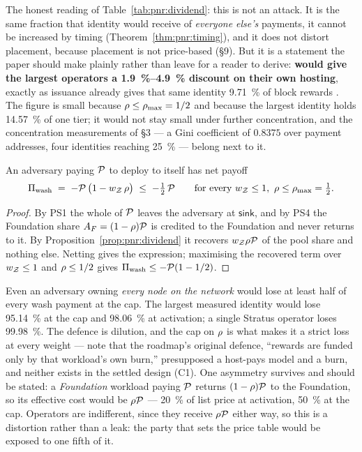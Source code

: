 The honest reading of Table~\ref{tab:pnr:dividend}: this is not an attack. It is the same fraction
that identity would receive of \emph{everyone else's} payments, it cannot be increased by timing
(Theorem~\ref{thm:pnr:timing}), and it does not distort placement, because placement is not
price-based (\S9). But it is a statement the paper should make plainly rather than leave for a
reader to derive: \textbf{\PNR would give the largest operators a \SIrange{1.9}{4.9}{\percent}
discount on their own hosting}, exactly as \PoN issuance already gives that same identity
\SI{9.71}{\percent} of block rewards \shipped
{}. The figure is small because
$\rho \le \rho_{\max} = 1/2$ and because the largest identity holds \SI{14.57}{\percent} of
one tier; it would not stay small under further concentration, and the concentration measurements of
\S3 --- a Gini coefficient of $0.8375$ over payment addresses, four identities reaching
\SI{25}{\percent} --- belong next to it.

\begin{proposition}
\label{prop:pnr:wash}
An adversary paying $\mathcal{P}$ to deploy to itself has net payoff
\[
  \Pi_{\mathrm{wash}} \;=\; -\mathcal{P}\,\big(1 - w_{\mathcal{Z}}\,\rho\big)
  \;\le\; -\tfrac12\,\mathcal{P}
  \qquad\text{for every } w_{\mathcal{Z}} \le 1,\ \rho \le \rho_{\max} = \tfrac12 .
\]
\end{proposition}

\begin{proof}
By PS1 the whole of $\mathcal{P}$ leaves the adversary at $\mathsf{sink}$, and by PS4 the Foundation share
$A_F = (1-\rho)\mathcal{P}$ is credited to the Foundation and never returns to it. By
Proposition~\ref{prop:pnr:dividend} it recovers $w_{\mathcal{Z}}\rho\mathcal{P}$ of the pool share and
nothing else. Netting gives the expression; maximising the recovered term over $w_{\mathcal{Z}} \le 1$ and
$\rho \le 1/2$ gives $\Pi_{\mathrm{wash}} \le -\mathcal{P}(1 - 1/2)$.
\end{proof}

\begin{remark}
Even an adversary owning \emph{every node on the network} would lose at least half of every wash
payment at the cap. The largest measured identity would lose \SI{95.14}{\percent} at the cap and
\SI{98.06}{\percent} at activation; a single Stratus operator loses \SI{99.98}{\percent}. The
defence is dilution, and the cap on $\rho$ is what makes it a strict loss at every weight ---
note that the roadmap's original defence, ``rewards are funded only by that workload's own burn,''
presupposed a host-pays model and a burn, and neither exists in the settled design (C1). One
asymmetry survives and should be stated: a \emph{Foundation} workload paying $\mathcal{P}$ returns
$(1-\rho)\mathcal{P}$ to the Foundation, so its effective cost would be $\rho\mathcal{P}$ ---
\SI{20}{\percent} of list price at activation, \SI{50}{\percent} at the cap. Operators are
indifferent, since they receive $\rho\mathcal{P}$ either way, so this is a distortion rather than a
leak: the party that sets the price table would be exposed to one fifth of it.
\end{remark}

